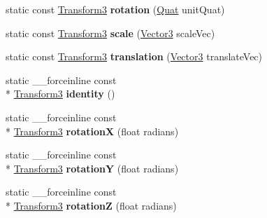 \begin{DoxyCompactItemize}
\item 
\hypertarget{classVectormath_1_1Aos_1_1Transform3_ab57118e3bfd4f1c2d10bfd67f44382de}{static const \hyperlink{classVectormath_1_1Aos_1_1Transform3}{Transform3} {\bfseries rotation} (\hyperlink{classVectormath_1_1Aos_1_1Quat}{Quat} unit\-Quat)}\label{classVectormath_1_1Aos_1_1Transform3_ab57118e3bfd4f1c2d10bfd67f44382de}

\item 
\hypertarget{classVectormath_1_1Aos_1_1Transform3_a34f11391bb4d8a5c57fd0c468fd4f398}{static const \hyperlink{classVectormath_1_1Aos_1_1Transform3}{Transform3} {\bfseries scale} (\hyperlink{classVectormath_1_1Aos_1_1Vector3}{Vector3} scale\-Vec)}\label{classVectormath_1_1Aos_1_1Transform3_a34f11391bb4d8a5c57fd0c468fd4f398}

\item 
\hypertarget{classVectormath_1_1Aos_1_1Transform3_aa7358eb38f08c0ea899aad01200231d5}{static const \hyperlink{classVectormath_1_1Aos_1_1Transform3}{Transform3} {\bfseries translation} (\hyperlink{classVectormath_1_1Aos_1_1Vector3}{Vector3} translate\-Vec)}\label{classVectormath_1_1Aos_1_1Transform3_aa7358eb38f08c0ea899aad01200231d5}

\item 
\hypertarget{classVectormath_1_1Aos_1_1Transform3_a2f402f913b656d557d9e26ecb3e1e682}{static \-\_\-\-\_\-forceinline const \\*
\hyperlink{classVectormath_1_1Aos_1_1Transform3}{Transform3} {\bfseries identity} ()}\label{classVectormath_1_1Aos_1_1Transform3_a2f402f913b656d557d9e26ecb3e1e682}

\item 
\hypertarget{classVectormath_1_1Aos_1_1Transform3_a50da2168687046c8f032d611d35515bd}{static \-\_\-\-\_\-forceinline const \\*
\hyperlink{classVectormath_1_1Aos_1_1Transform3}{Transform3} {\bfseries rotation\-X} (float radians)}\label{classVectormath_1_1Aos_1_1Transform3_a50da2168687046c8f032d611d35515bd}

\item 
\hypertarget{classVectormath_1_1Aos_1_1Transform3_af7694817185c097f5626ee2cd7bb9d87}{static \-\_\-\-\_\-forceinline const \\*
\hyperlink{classVectormath_1_1Aos_1_1Transform3}{Transform3} {\bfseries rotation\-Y} (float radians)}\label{classVectormath_1_1Aos_1_1Transform3_af7694817185c097f5626ee2cd7bb9d87}

\item 
\hypertarget{classVectormath_1_1Aos_1_1Transform3_a41a0fb6a242378d4d5ff83d3c95ad395}{static \-\_\-\-\_\-forceinline const \\*
\hyperlink{classVectormath_1_1Aos_1_1Transform3}{Transform3} {\bfseries rotation\-Z} (float radians)}\label{classVectormath_1_1Aos_1_1Transform3_a41a0fb6a242378d4d5ff83d3c95ad395}


\end{DoxyCompactItemize}
